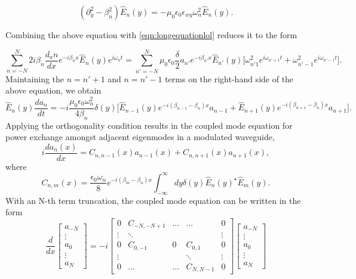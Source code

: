 \begin{equation}
(\partial^2_y - \beta^2_n) \hat{E}_n(y) = -\mu_0 \epsilon_0 \epsilon_{wg} \omega^2_n \hat{E}_n(y).
\end{equation}

Combining the above equation with \ref{eqn:longequationlol} reduces it to the form

\begin{equation}
\sum_{n=-N}^{N} 2 i \beta_n \dfrac{d_a n}{dx} e^{-i \beta_n x} \hat{E}_n(y) e^{i \omega_n t} =  \sum_{n'=-N}^{N} \mu_0 \epsilon_0 \dfrac{\delta}{2} a_{n'} e^{-i \beta_{n'} x} \hat{E}_{n'}(y) \big[\omega^2_{n'1}e^{i \omega_{n'+1}t} + \omega_{n'-1}^2 e^{i \omega_{n'-1} t} \big].
\end{equation}
Maintaining the $n=n'+1$ and $n=n'-1$ terms on the right-hand side of the above equation, we obtain
\begin{equation}
\hat{E}_n(y) \dfrac{d a_n}{dt} = - i \dfrac{\mu_0 \epsilon_0 \omega^2_n}{4 \beta_n} \delta(y) \Big[ \hat{E}_{n-1} (y) e^{-i(\beta_{n-1} - \beta_n)x} a_{n-1} + \hat{E}_{n+1}(y) e^{-i(\beta_{n+1} - \beta_n)x} a_{n+1} \Big].
\end{equation}
Applying the orthogonality condition results in the coupled mode equation for power exchange amongst adjacent eigenmodes in a modulated waveguide,
\begin{equation}
i \dfrac{d a_n (x)}{dx} = C_{n,n-1} (x) a_{n-1}(x) + C_{n,n+1} (x) a_{n+1} (x),
\end{equation}
where
\begin{equation}
C_{n,m} (x) = \dfrac{\epsilon_0 \omega_n}{8} e^{-i(\beta_m - \beta_n)x} \int_{-\infty}^{\infty} dy \delta(y) \hat{E}_n(y)^{\star} \hat{E}_m(y).
\end{equation}
With an N-th term truncation, the coupled mode equation can be written in the form
\begin{equation}
\dfrac{d}{dx} \begin{bmatrix}
a_{-N} \\
 \vdots \\
a_0 \\
 \vdots \\
a_N
\end{bmatrix}
=
-i
\begin{bmatrix}
0 & C_{-N,-N+1} & \dots & \dots & 0 \\
\vdots & \ddots & & & \vdots \\
0 & C_{0,-1} & 0 & C_{0,1} & 0 \\
\vdots & & & \ddots & \vdots \\
0 & \dots & \dots & C_{N,N-1} & 0 
\end{bmatrix}
\begin{bmatrix}
a_{-N} \\
\vdots \\
a_0 \\
\vdots \\
a_N
\end{bmatrix}
\end{equation}

